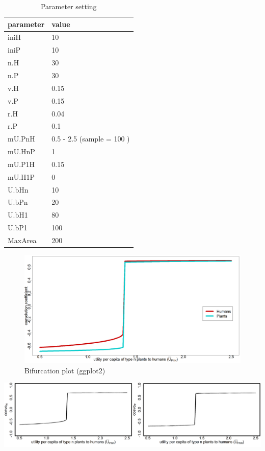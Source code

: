 \documentclass[
]{book}
\begin{document}
\begin{table}[!h]

\caption{\label{tab:2mUPnHtablepdf}Parameter setting}
\centering
\begin{tabular}[t]{l|l}
\hline
parameter & value\\
\hline
iniH & 10\\
\hline
iniP & 10\\
\hline
n.H & 30\\
\hline
n.P & 30\\
\hline
v.H & 0.15\\
\hline
v.P & 0.15\\
\hline
r.H & 0.04\\
\hline
r.P & 0.1\\
\hline
mU.PnH & 0.5 - 2.5 (sample = 100 )\\
\hline
mU.HnP & 1\\
\hline
mU.P1H & 0.15\\
\hline
mU.H1P & 0\\
\hline
U.bHn & 10\\
\hline
U.bPn & 20\\
\hline
U.bH1 & 80\\
\hline
U.bP1 & 100\\
\hline
MaxArea & 200\\
\hline
\end{tabular}
\end{table}

\begin{figure}
\includegraphics[width=1\linewidth]{plots/2_onePar-mU.PnH_ggbifplot} \caption{Bifurcation plot (ggplot2)}\label{fig:2mUPnHbifplot1print}
\end{figure}

\includegraphics[width=1\linewidth]{plots/2_onePar-mU.PnH_bifplot-pair}
\end{document}
